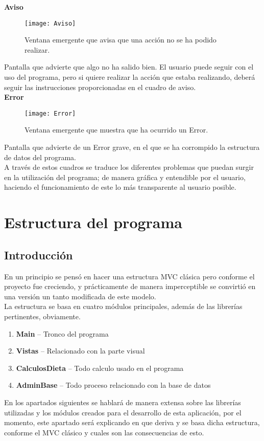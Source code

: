 \textbf{Aviso}\\

\begin{figure}[ht]
\centering
\texttt{[image: Aviso]} 
\caption{Ventana emergente que avisa que una acción no se ha podido realizar.}
\end{figure}
Pantalla que advierte que algo no ha salido bien. El usuario puede seguir con el uso del programa, pero si quiere realizar la acción que estaba realizando, deberá seguir las instrucciones proporcionadas en el cuadro de aviso.\\

\textbf{Error}\\

\begin{figure}[ht]
\centering
\texttt{[image: Error]} 
\caption{Ventana emergente que muestra que ha ocurrido un Error.}
\end{figure}
Pantalla que advierte de un Error grave, en el que se ha corrompido la estructura de datos del programa.\\

A través de estos cuadros se traduce los diferentes problemas que puedan surgir en la utilización del programa; de manera gráfica y entendible por el usuario, haciendo el funcionamiento de este lo más transparente al usuario posible.
\section{Estructura del programa}
\subsection{Introducción}
En un principio se pensó en hacer una estructura MVC clásica pero conforme el proyecto fue creciendo, y prácticamente de manera imperceptible se convirtió en una versión un tanto modificada de este modelo.\\

La estructura se basa en cuatro módulos principales, además de las librerías pertinentes, obviamente. 
\begin{enumerate}
\item	\textbf{Main} – Tronco del programa
\item	\textbf{Vistas} – Relacionado con la parte visual
\item	\textbf{CalculosDieta} – Todo calculo usado en el programa
\item	\textbf{AdminBase} – Todo proceso relacionado con la base de datos

\end{enumerate}
En los apartados siguientes se hablará de manera extensa sobre las librerías utilizadas y los módulos creados para el desarrollo
 de esta aplicación, por el momento, este apartado será explicando en que deriva y se basa dicha estructura, conforme el MVC clásico y cuales son las consecuencias de esto.
